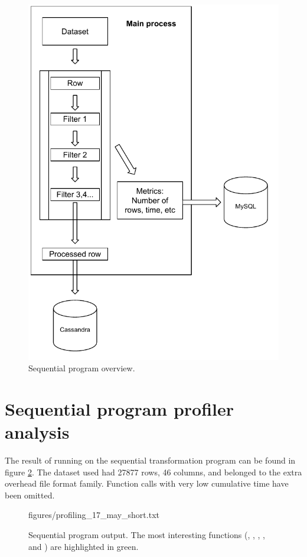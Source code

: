 \begin{figure}[ht]
  \centering
  \includegraphics[width=120mm]{figures/program_overview_sequential.pdf}
  \caption[Sequential program overview.]{Sequential program overview.}
  \label{fig:sequential_program_overview}
\end{figure}

\section{Sequential program profiler analysis} \label{section:sequential_profiler}
The result of running  on the sequential transformation program can be found in figure \ref{fig:sequential_profiler}. The dataset used had
27877 rows, 46 columns, and belonged to the extra overhead file format family.
Function calls with very low cumulative time have been omitted. 

\begin{figure}[ht]
  \begin{VerbatimInput}{figures/profiling_17_may_short.txt}
    \caption[Sequential program  output.]{Sequential program  output. The most interesting functions (,
    , , , and ) are highlighted in green.}
  \label{fig:sequential_profiler}
\end{VerbatimInput}
\end{figure}

